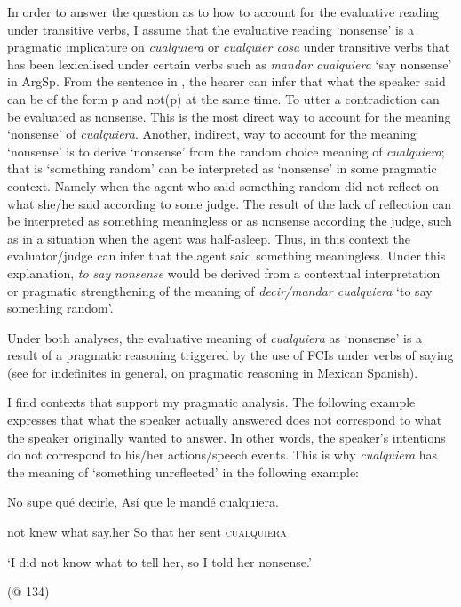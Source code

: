 \documentclass[output=paper]{langscibook}
\begin{document}
  In order to answer the question as to how to account for the evaluative reading under transitive verbs, I assume that the evaluative reading ‘nonsense’ is a pragmatic implicature on \textit{cualquiera} or \textit{cualquier cosa} under transitive verbs that has been lexicalised under certain verbs such as \textit{mandar cualquiera} ‘say nonsense’ in ArgSp. From the sentence in , the hearer can infer that what the speaker said can be of the form p and not(p) at the same time. To utter a contradiction can be evaluated as nonsense. This is the most direct way to account for the meaning ‘nonsense’ of \textit{cualquiera}. Another, indirect, way to account for the meaning ‘nonsense’ is to derive ‘nonsense’ from the random choice meaning of \textit{cualquiera}; that is ‘something random’ can be interpreted as ‘nonsense’ in some pragmatic context. Namely when the agent who said something random did not reflect on what she/he said according to some judge. The result of the lack of reflection can be interpreted as something meaningless or as nonsense according the judge, such as in a situation when the agent was half-asleep. Thus, in this context the evaluator/judge can infer that the agent said something meaningless. Under this explanation, \textit{to say} \textit{nonsense} would be derived from a contextual interpretation or pragmatic strengthening of the meaning of \textit{decir/mandar cualquiera} ‘to say something random’. 

  Under both analyses, the evaluative meaning of \textit{cualquiera} as ‘nonsense’ is a result of a pragmatic reasoning triggered by the use of FCIs under verbs of saying (see \citealt{Aloni2005} for indefinites in general, \citealt{Author2020a} on pragmatic reasoning in Mexican Spanish). 

  I find contexts that support my pragmatic analysis. The following example expresses that what the speaker actually answered does not correspond to what the speaker originally wanted to answer. In other words, the speaker’s intentions do not correspond to his/her actions/speech events. This is why \textit{cualquiera} has the meaning of ‘something unreflected’ in the following example:

    No  supe  qué  decirle,  Así  que  le  mandé  cualquiera.

    not  knew  what  say.her  So  that  her  sent  \textsc{cualquiera}

    ‘I did not know what to tell her, so I told her nonsense.’

    (@ 134)
\end{document}
